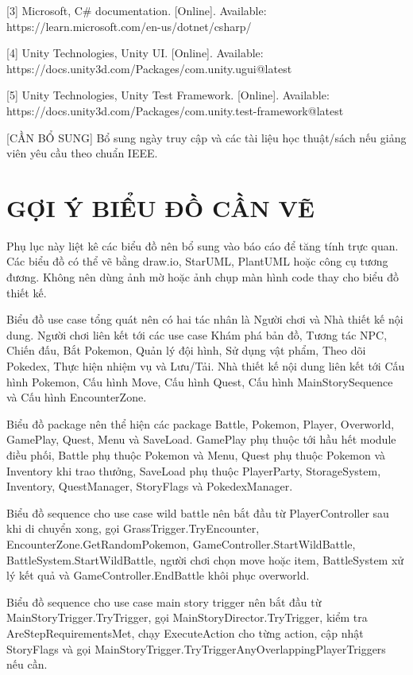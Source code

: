 [3] Microsoft, C\# documentation. [Online]. Available: https://learn.microsoft.com/en-us/dotnet/csharp/

[4] Unity Technologies, Unity UI. [Online]. Available: https://docs.unity3d.com/Packages/com.unity.ugui@latest

[5] Unity Technologies, Unity Test Framework. [Online]. Available: https://docs.unity3d.com/Packages/com.unity.test-framework@latest

[CẦN BỔ SUNG] Bổ sung ngày truy cập và các tài liệu học thuật/sách nếu giảng viên yêu cầu theo chuẩn IEEE.

\appendix

\chapter{GỢI Ý BIỂU ĐỒ CẦN VẼ}

Phụ lục này liệt kê các biểu đồ nên bổ sung vào báo cáo để tăng tính trực quan. Các biểu đồ có thể vẽ bằng draw.io, StarUML, PlantUML hoặc công cụ tương đương. Không nên dùng ảnh mờ hoặc ảnh chụp màn hình code thay cho biểu đồ thiết kế.

Biểu đồ use case tổng quát nên có hai tác nhân là Người chơi và Nhà thiết kế nội dung. Người chơi liên kết tới các use case Khám phá bản đồ, Tương tác NPC, Chiến đấu, Bắt Pokemon, Quản lý đội hình, Sử dụng vật phẩm, Theo dõi Pokedex, Thực hiện nhiệm vụ và Lưu/Tải. Nhà thiết kế nội dung liên kết tới Cấu hình Pokemon, Cấu hình Move, Cấu hình Quest, Cấu hình MainStorySequence và Cấu hình EncounterZone.

Biểu đồ package nên thể hiện các package Battle, Pokemon, Player, Overworld, GamePlay, Quest, Menu và SaveLoad. GamePlay phụ thuộc tới hầu hết module điều phối, Battle phụ thuộc Pokemon và Menu, Quest phụ thuộc Pokemon và Inventory khi trao thưởng, SaveLoad phụ thuộc PlayerParty, StorageSystem, Inventory, QuestManager, StoryFlags và PokedexManager.

Biểu đồ sequence cho use case wild battle nên bắt đầu từ PlayerController sau khi di chuyển xong, gọi GrassTrigger.TryEncounter, EncounterZone.GetRandomPokemon, GameController.StartWildBattle, BattleSystem.StartWildBattle, người chơi chọn move hoặc item, BattleSystem xử lý kết quả và GameController.EndBattle khôi phục overworld.

Biểu đồ sequence cho use case main story trigger nên bắt đầu từ MainStoryTrigger.TryTrigger, gọi MainStoryDirector.TryTrigger, kiểm tra AreStepRequirementsMet, chạy ExecuteAction cho từng action, cập nhật StoryFlags và gọi MainStoryTrigger.TryTriggerAnyOverlappingPlayerTriggers nếu cần.

